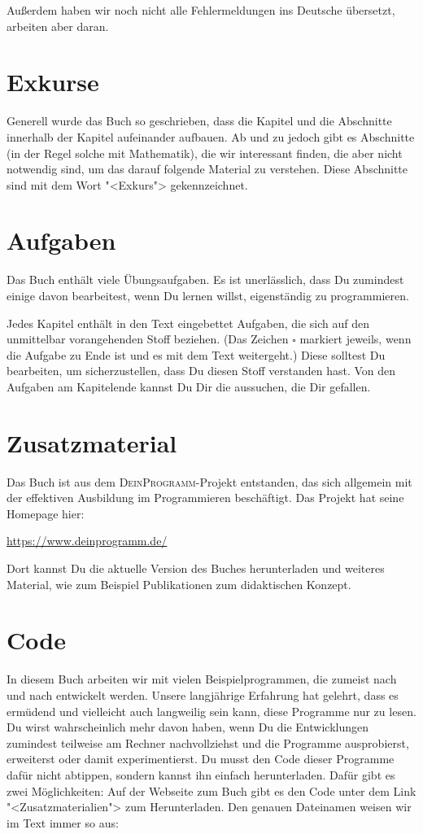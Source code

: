 Außerdem haben wir noch nicht alle Fehlermeldungen ins Deutsche
übersetzt, arbeiten aber daran.

\section{Exkurse}

Generell wurde das Buch so geschrieben, dass die Kapitel und die
Abschnitte innerhalb der Kapitel aufeinander aufbauen.  Ab und zu
jedoch gibt es Abschnitte (in der Regel solche mit Mathematik), die
wir interessant finden, die aber nicht notwendig sind, um das darauf
folgende Material zu verstehen.  Diese Abschnitte sind mit dem Wort
"<Exkurs"> gekennzeichnet.

\section{Aufgaben}

Das Buch enthält viele Übungsaufgaben.  Es ist unerlässlich, dass Du
zumindest einige davon bearbeitest, wenn Du lernen willst,
eigenständig zu programmieren.

Jedes Kapitel enthält in den Text eingebettet Aufgaben, die sich auf
den unmittelbar vorangehenden Stoff beziehen.  (Das Zeichen
\(\square\) markiert jeweils, wenn die Aufgabe zu Ende ist und es mit
dem Text weitergeht.)  Diese solltest Du bearbeiten, um
sicherzustellen, dass Du diesen Stoff verstanden hast.  Von den
Aufgaben am Kapitelende kannst Du Dir die aussuchen, die Dir gefallen.

\section{Zusatzmaterial}

Das Buch ist aus dem \textsc{DeinProgramm}-Projekt entstanden, das
sich allgemein mit der effektiven Ausbildung im Programmieren
beschäftigt.  Das Projekt hat seine Homepage hier:
%
\begin{center}
  \url{https://www.deinprogramm.de/}
\end{center}
%
Dort kannst Du die aktuelle Version des Buches herunterladen und
weiteres Material, wie zum Beispiel Publikationen zum didaktischen
Konzept.

\section{Code}

In diesem Buch arbeiten wir mit vielen Beispielprogrammen, die zumeist
nach und nach entwickelt werden.  Unsere langjährige Erfahrung hat
gelehrt, dass es ermüdend und vielleicht auch langweilig sein kann,
diese Programme nur zu lesen. Du wirst
wahrscheinlich mehr davon haben, wenn Du die Entwicklungen zumindest
teilweise am Rechner nachvollziehst und die Programme ausprobierst,
erweiterst oder damit experimentierst.
Du musst den Code dieser Programme dafür nicht abtippen,
sondern kannst ihn einfach herunterladen.  Dafür gibt es zwei
Möglichkeiten: Auf der Webseite zum Buch gibt es den Code unter dem
Link "<Zusatzmaterialien"> zum Herunterladen.  Den genauen Dateinamen
weisen wir im Text immer so aus:

